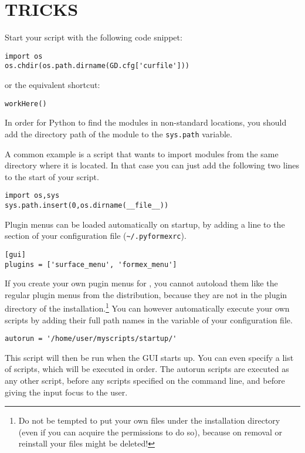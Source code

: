 \section{TRICKS}
\label{sec:tricks}

\begin{enumerate}
Start your script with the following code snippet:
\begin{verbatim}
import os
os.chdir(os.path.dirname(GD.cfg['curfile']))
\end{verbatim}
or the equivalent shortcut:
\begin{verbatim}
workHere()
\end{verbatim}

In order for Python to find the modules in non-standard locations, you should add the directory path of the module to the \verb|sys.path| variable. 

A common example is a script that wants to import modules from the same directory where it is located. In that case you can just add the following two lines to the start of your script.
\begin{verbatim}
import os,sys
sys.path.insert(0,os.dirname(__file__))
\end{verbatim}

Plugin menus can be loaded automatically on \pyformex startup, by adding a line to the  section of your configuration file (\verb|~/.pyformexrc|).
\begin{verbatim}
[gui]
plugins = ['surface_menu', 'formex_menu']
\end{verbatim}

If you create your own pugin menus for \pyformex, you cannot autoload them like the regular plugin menus from the distribution, because they are not in the plugin directory of the installation.\footnote{Do not be tempted to put your own files under the installation directory (even if you can acquire the permissions to do so), because on removal or reinstall your files might be deleted!}
You can however automatically execute your own scripts by adding their full path names in the  variable of your configuration file.
\begin{verbatim}
autorun = '/home/user/myscripts/startup/'
\end{verbatim}
This script will then be run when the \pyformex GUI starts up. You can even specify a list of scripts, which will be executed in order.
The autorun scripts are executed as any other \pyformex script, before any scripts specified on the command line, and before giving the input focus to the user.


\end{enumerate}
